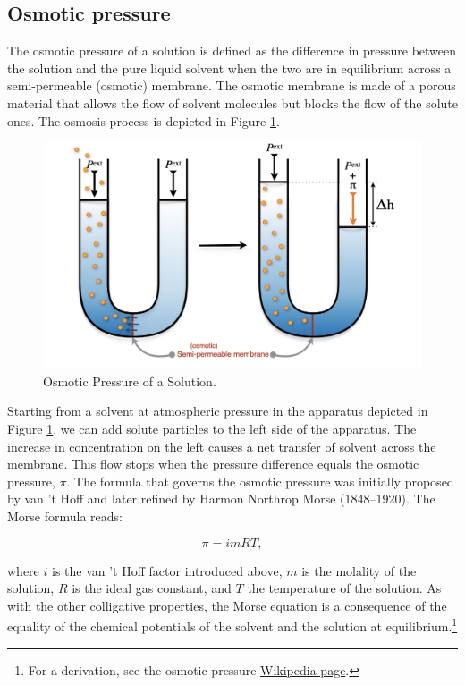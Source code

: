 \documentclass[
  9pt,
]{extbook}
\theoremstyle{definition}
\theoremstyle{definition}
\theoremstyle{definition}
\theoremstyle{remark}
\begin{document}
\hypertarget{osmotic-pressure}{%
\subsection{Osmotic pressure}\label{osmotic-pressure}}

The osmotic pressure of a solution is defined as the difference in pressure between the solution and the pure liquid solvent when the two are in equilibrium across a semi-permeable (osmotic) membrane. The osmotic membrane is made of a porous material that allows the flow of solvent molecules but blocks the flow of the solute ones. The osmosis process is depicted in Figure \ref{fig:FigSol3}.

\begin{figure}

{\centering \includegraphics[width=0.8\linewidth]{./img/OEP_Figures.035} 

}

\caption{Osmotic Pressure of a Solution.}\label{fig:FigSol3}
\end{figure}

Starting from a solvent at atmospheric pressure in the apparatus depicted in Figure \ref{fig:FigSol3}, we can add solute particles to the left side of the apparatus. The increase in concentration on the left causes a net transfer of solvent across the membrane. This flow stops when the pressure difference equals the osmotic pressure, \(\pi\). The formula that governs the osmotic pressure was initially proposed by van 't Hoff and later refined by Harmon Northrop Morse (1848--1920). The Morse formula reads:

\begin{equation}
\pi = imRT,
\label{eq:coll8}
\end{equation}

where \(i\) is the van 't Hoff factor introduced above, \(m\) is the molality of the solution, \(R\) is the ideal gas constant, and \(T\) the temperature of the solution. As with the other colligative properties, the Morse equation is a consequence of the equality of the chemical potentials of the solvent and the solution at equilibrium.\footnote{For a derivation, see the osmotic pressure \href{https://en.wikipedia.org/wiki/Osmotic_pressure}{Wikipedia page}.}
\end{document}
